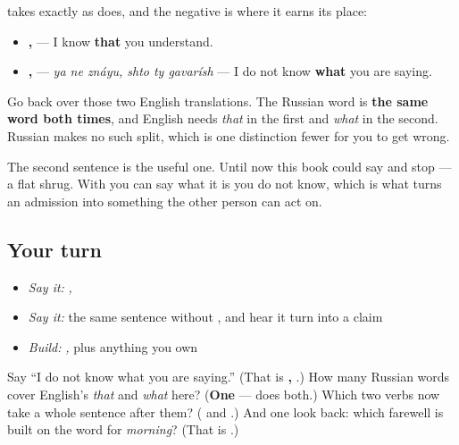 \begin{grammarlens}[title={Grammar lens — the other frame, and the negative one}]
\textbf{} takes \textbf{} exactly as \textbf{} does, and the negative is where it earns its place:

\begin{itemize}
\raggedright
  \item \textbf{ ,   } — I know \textbf{that} you understand.
  \item \textbf{  ,   } — \emph{ya ne znáyu, shto ty gavarísh} — I do not know \textbf{what} you are saying.
\end{itemize}

Go back over those two English translations. The Russian word is \textbf{the same word both times}, and English needs \emph{that} in the first and \emph{what} in the second. Russian makes no such split, which is one distinction fewer for you to get wrong.

The second sentence is the useful one. Until now this book could say \emph{  } and stop — a flat shrug. With \textbf{} you can say what it is you do not know, which is what turns an admission into something the other person can act on.
\end{grammarlens}

\subsection*{Your turn}
\begin{itemize}
\raggedright
  \item \emph{Say it:} \emph{  ,   }
  \item \emph{Say it:} the same sentence without \textbf{}, and hear it turn into a claim
  \item \emph{Build:} \emph{  , } plus anything you own
\end{itemize}

\begin{tcolorbox}[breakable,colback=teal!4,colframe=teal!35!black,title={Before you move on}]
Say \textquotedblleft{}I do not know what you are saying.\textquotedblright{} (That is \textbf{  ,   }.) How many Russian words cover English's \emph{that} and \emph{what} here? (\textbf{One} — \textbf{} does both.) Which two verbs now take a whole sentence after them? (\textbf{} and \textbf{}.) And one look back: which farewell is built on the word for \emph{morning}? (That is \textbf{ }.)
\end{tcolorbox}
